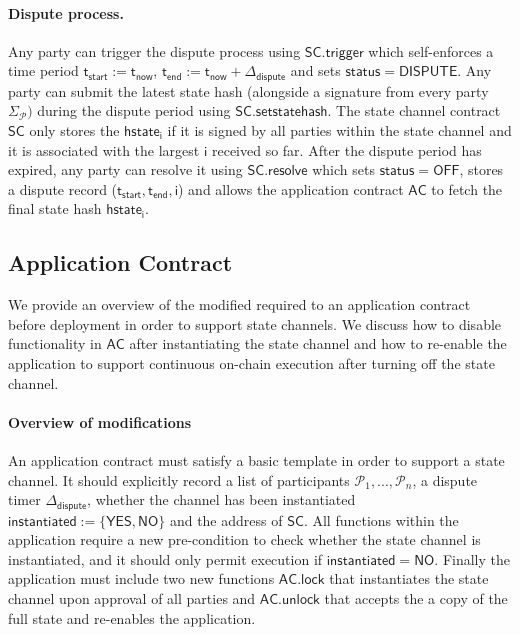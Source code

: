 \documentclass{llncs}
\newcommand{\instantiated}{\mathsf{instantiated}}
\newcommand{\instantiatedno}{\mathsf{NO}}
\newcommand{\instantiatedyes}{\mathsf{YES}}
\newcommand{\chanstatus}{\mathsf{status}}
\newcommand{\chandispute}{\mathsf{DISPUTE}}
\newcommand{\chanoff}{\mathsf{OFF}}
\newcommand{\hstatei}{\mathsf{hstate}_{\monotoniccounter}}
\newcommand{\monotoniccounter}{\mathsf{i}}
\newcommand{\participant}{\mathcal{P}}
\newcommand{\statechannel}{\mathsf{SC}}
\newcommand{\statechanneldispute}{\mathsf{SC}.\mathsf{trigger}}
\newcommand{\statechannelsetstate}{\mathsf{SC}.\mathsf{setstatehash}}
\newcommand{\statechannelresolve}{\mathsf{SC}.\mathsf{resolve}}
\newcommand{\appcontract}{\mathsf{AC}}
\newcommand{\applock}{\mathsf{AC.lock}}
\newcommand{\appunlock}{\mathsf{AC.unlock}}
\newcommand{\timerdispute}{\mathsf{\Delta}_{\mathsf{dispute}}}
\newcommand{\timenow}{\mathsf{t}_{\mathsf{now}}}
\newcommand{\timestart}{\mathsf{t}_{\mathsf{start}}}
\newcommand{\timeend}{\mathsf{t}_{\mathsf{end}}}
\newcommand{\timedispute}{\timenow + \mathsf{\Delta}_{\mathsf{dispute}}}
\begin{document}
\paragraph{Dispute process.} 

Any party can trigger the dispute process using $\statechanneldispute$ which self-enforces a time period $\timestart := \timenow$, $\timeend := \timedispute$ and sets $\chanstatus = \chandispute$. 
Any party can submit the latest state hash (alongside a signature from every party $\Sigma_{\participant})$ during the dispute period using $\statechannelsetstate$. 
The state channel contract $\statechannel$ only stores the $\hstatei$ if it is  signed by all parties within the state channel and it is  associated with the largest $\monotoniccounter$ received so far. 
After the dispute period has expired, any party can resolve it using $\statechannelresolve$ which sets $\chanstatus = \chanoff$, stores a dispute record ($\timestart,\timeend, \monotoniccounter$) and allows the application contract $\appcontract$ to fetch the final state hash $\hstatei$. 

\subsection{Application Contract}

We provide an overview of the modified required to an application contract before deployment in order to support state channels. We discuss how to disable functionality in $\appcontract$ after instantiating the state channel and how to re-enable the application to support continuous on-chain execution after turning off the state channel. 

\paragraph{Overview of modifications}
An application contract must satisfy a basic template in order to support a state channel. 
It should explicitly record a list of participants $\participant_{1},...,\participant_{n}$, a dispute timer $\timerdispute$, whether the channel has been instantiated  $\instantiated := \{\instantiatedyes, \instantiatedno\}$ and the address of $\statechannel$. 
All functions within the application require a new pre-condition to check whether the state channel is instantiated, and it should only permit execution if $\instantiated = \instantiatedno$. 
Finally the application must include two new functions $\applock$ that instantiates the state channel upon approval of all parties and $\appunlock$ that accepts the a copy of the full state and re-enables the application. 
\end{document}
